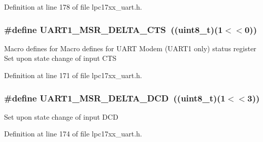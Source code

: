 \-Definition at line 178 of file lpc17xx\-\_\-uart.\-h.

\hypertarget{group___u_a_r_t___private___macros_ga2bb22876f02e34aa21bcd162cea55efb}{
\subsubsection[{\-U\-A\-R\-T1\-\_\-\-M\-S\-R\-\_\-\-D\-E\-L\-T\-A\-\_\-\-C\-T\-S}]{\setlength{\rightskip}{0pt plus 5cm}\#define {\bf \-U\-A\-R\-T1\-\_\-\-M\-S\-R\-\_\-\-D\-E\-L\-T\-A\-\_\-\-C\-T\-S}~((uint8\-\_\-t)(1$<$$<$0))}}\label{group___u_a_r_t___private___macros_ga2bb22876f02e34aa21bcd162cea55efb}
\-Macro defines for \-Macro defines for \-U\-A\-R\-T \-Modem (\-U\-A\-R\-T1 only) status register \-Set upon state change of input \-C\-T\-S 

\-Definition at line 171 of file lpc17xx\-\_\-uart.\-h.

\hypertarget{group___u_a_r_t___private___macros_ga8fb22a29caf2b5ca74022ea9f0a90185}{
\subsubsection[{\-U\-A\-R\-T1\-\_\-\-M\-S\-R\-\_\-\-D\-E\-L\-T\-A\-\_\-\-D\-C\-D}]{\setlength{\rightskip}{0pt plus 5cm}\#define {\bf \-U\-A\-R\-T1\-\_\-\-M\-S\-R\-\_\-\-D\-E\-L\-T\-A\-\_\-\-D\-C\-D}~((uint8\-\_\-t)(1$<$$<$3))}}\label{group___u_a_r_t___private___macros_ga8fb22a29caf2b5ca74022ea9f0a90185}
\-Set upon state change of input \-D\-C\-D 

\-Definition at line 174 of file lpc17xx\-\_\-uart.\-h.

